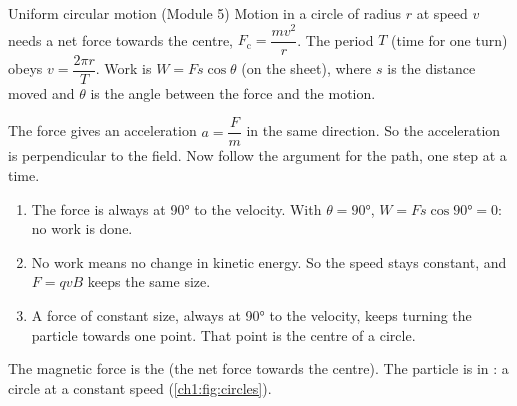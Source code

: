 \begin{refresher}{Uniform circular motion (Module 5)}
Motion in a circle of radius $r$ at speed $v$ needs a net force towards the
centre, $F_\mathrm{c} = \dfrac{mv^2}{r}$. The period $T$ (time for one turn)
obeys $v = \dfrac{2\pi r}{T}$. Work is $W = Fs\cos\theta$ (on the sheet), where
$s$ is the distance moved and $\theta$ is the angle between the force and the
motion.
\end{refresher}

The force gives an acceleration $a = \dfrac{F}{m}$ in the same direction. So
the acceleration is perpendicular to the field. Now follow the argument for the
path, one step at a time.
\begin{enumerate}
  \item The force is always at \ang{90} to the velocity. With $\theta = \ang{90}$,
        $W = Fs\cos\ang{90} = 0$: no work is done.
  \item No work means no change in kinetic energy. So the speed stays
        constant, and $F = qvB$ keeps the same size.
  \item A force of constant size, always at \ang{90} to the velocity, keeps
        turning the particle towards one point. That point is the centre of a
        circle.
\end{enumerate}
The magnetic force is the  (the net force towards the
centre). The particle is in : a circle at a
constant speed (\cref{ch1:fig:circles}).

